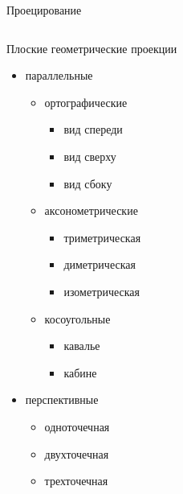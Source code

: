 \documentclass{beamer}
\begin{document}
	\begin{frame}{Проецирование}
		

		\begin{columns}
			\begin{column}{0.55\textwidth}

		Плоские геометрические проекции
		\begin{itemize}
			\item параллельные
			\begin{itemize}
				\item ортографические
				\begin{itemize}
					\item вид спереди
					\item вид сверху
					\item вид сбоку
				\end{itemize}
				\item аксонометрические
				\begin{itemize}
					\item триметрическая
					\item диметрическая
					\item изометрическая
				\end{itemize}
				\item косоугольные
				\begin{itemize}
					\item кавалье
					\item кабине 
				\end{itemize}
			\end{itemize}
			\item перспективные
			\begin{itemize}
				\item одноточечная
				\item двухточечная
				\item трехточечная
			\end{itemize}
		\end{itemize}


\end{column}
\end{columns}
\end{frame}
\end{document}
